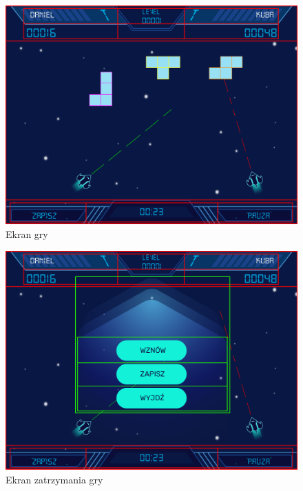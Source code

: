\documentclass[a4paper]{article}
\begin{document}
\begin{figure}[H]
    \centering
    \includegraphics[width=1\textwidth]{img/ekran-gry-grid.png}
    \caption{Ekran gry}
    \label{fig:gra}
\end{figure}

\begin{figure}[H]
    \centering
    \includegraphics[width=1\textwidth]{img/ekran-pauza-grid.png}
    \caption{Ekran zatrzymania gry}
    \label{fig:pauza}
\end{figure}
\end{document}
